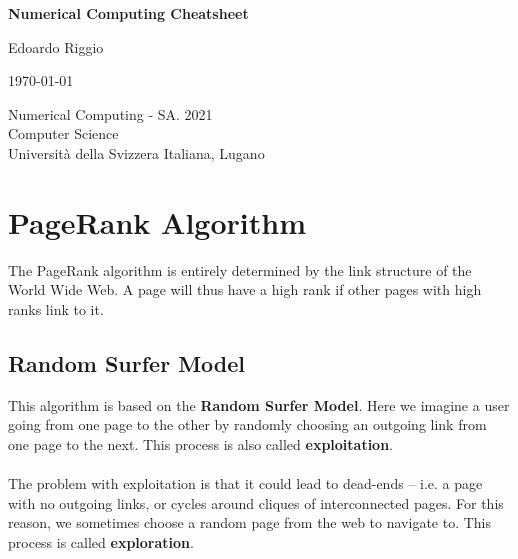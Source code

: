 \documentclass{article}
\begin{document}
\begin{titlepage}
    \begin{center}
        \vspace*{1cm}
        
        \Huge
        \textbf{Numerical Computing Cheatsheet}
        
        \vspace{0.5cm}
        \LARGE
        
        \vspace{.5cm}
        
        Edoardo Riggio
   		  \vspace{1.5cm}
       
        \vfill
        
        \today
        
        \vspace{.8cm}
          \Large
          Numerical Computing - SA. 2021 \\
        Computer Science\\
        Universit\`{a} della Svizzera Italiana, Lugano\\
        
    \end{center}
\end{titlepage}

\tableofcontents

\newpage

\section{PageRank Algorithm}
The PageRank algorithm is entirely determined by the link structure of the World Wide Web. A page will thus have a high rank if other pages with high ranks link to it.

\subsection{Random Surfer Model}
This algorithm is based on the \textbf{Random Surfer Model}. Here we imagine a user going from one page to the other by randomly choosing an outgoing link from one page to the next. This process is also called \textbf{exploitation}. \\ \\
The problem with exploitation is that it could lead to dead-ends -- i.e. a page with no outgoing links, or cycles around cliques of interconnected pages. For this reason, we sometimes choose a random page from the web to navigate to. This process is called \textbf{exploration}.
\end{document}

